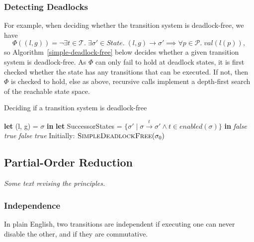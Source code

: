 \documentclass[12pt,a4paper,twoside,openright]{report}
\newcommand{\Let}[2]{\State \textbf{let} #1 = #2 \textbf{in}}
\begin{document}
\subsubsection{Detecting Deadlocks}
For example, when deciding whether the transition system
is deadlock-free, we have
\[
	\Phi((l, g)) =\neg \exists t \in \mathcal{T}.\;
	\exists\sigma' \in \textit{State}.\;(l, g) \longrightarrow \sigma'
	\implies \forall p \in \mathcal{P}.\;\textit{val}(l(p)),
\]
so Algorithm~\ref{simple-deadlock-free} below decides whether a given transition system
is deadlock-free. As $\Phi$ can only fail to hold at deadlock states, it is first
checked whether the state has any transitions that can be executed. If not, then
$\Phi$ is checked to hold, else as above, recursive calls implement a
depth-first search of the reachable state space.

\begin{algorithm} \caption{Deciding if a transition system is deadlock-free}
	\label{simple-deadlock-free} \begin{algorithmic}[1]
		\Let{(l, g)}{$\sigma$}
		\Let{SuccessorStates}{$\{\sigma' \mid \sigma \xrightarrow{t}
			\sigma' \wedge t \in \textit{enabled}(\sigma)\}$}
				 \Return \textit{false}
				\EndIf
			\EndFor
			\State \Return \textit{true}
		\Else
					\Return \textit{false}
				\EndIf
			\EndFor
		\State \Return \textit{true}
		\EndIf
		\EndProcedure
		\State
		\State Initially: $\textsc{SimpleDeadlockFree}(\sigma_0)$
	\end{algorithmic}
\end{algorithm}

\subsection{Partial-Order Reduction}
\textit{Some text revising the principles.}

\subsubsection{Independence} \label{sec:independence}
In plain English, two transitions are independent if executing one
can never disable the other, and if they are commutative.
\end{document}

